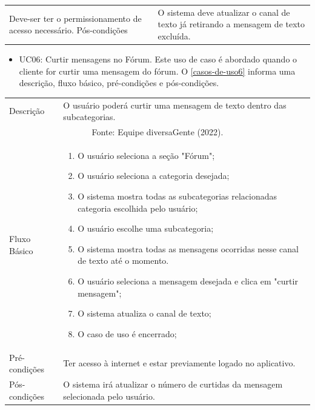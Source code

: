 \begin{apendicesenv}
\begin{longtable}{|p{3.3cm}|p{12.3cm}|}
		Deve-ser ter o permissionamento de acesso necessário.
		\hline
		Pós-condições & O sistema deve atualizar o canal de texto já retirando a mensagem de texto excluída.
		\hline
	\end{longtable}
	
	
	\begin{itemize}
		\item UC06: Curtir mensagens no Fórum. Este uso de caso é abordado quando o cliente for curtir uma mensagem do fórum. O 	\autoref{casos-de-uso6} informa uma descrição, fluxo básico, pré-condições e  pós-condições.\\
	\end{itemize}

	\begin{quadro}[htb]
		\centering
		\ABNTEXfontereduzida
		\caption[Caso de Uso Curtir mensagens no Fórum]{Caso de Uso Curtir mensagens no Fórum}
		\label{casos-de-uso6}
	\end{quadro}

\pagebreak

		\begin{longtable}{|p{3.3cm}|p{12.3cm}|}
		\hline
		\thead{} & \thead{Ator} \\
		\hline
		Descrição & O usuário poderá curtir uma mensagem de texto dentro das subcategorias.\\
		\hline
						
		\endfirsthead
		\multicolumn{2}{c}{\scriptsize Fonte: Equipe diversaGente (2022).}%
		{{ \autoref{casos-de-uso6} continued from previous page}} \\
		\endhead
		
		Fluxo Básico  & 
		\begin{enumerate}
			\item O usuário seleciona a seção "Fórum";
			\item O usuário seleciona a categoria desejada;
			\item O sistema mostra todas as subcategorias relacionadas categoria escolhida pelo usuário;
			\item O usuário escolhe uma subcategoria;
			\item O sistema mostra todas as mensagens ocorridas nesse canal de texto até o momento. 
			\item  O usuário seleciona a mensagem desejada e clica em "curtir mensagem";
			\item  O sistema atualiza o canal de texto;
			\item  O caso de uso é encerrado;
		\end{enumerate}\\
		\hline
		Pré-condições & Ter acesso à internet e estar previamente logado no aplicativo.\\
		\hline
		Pós-condições & O sistema irá atualizar o número de curtidas da mensagem selecionada pelo usuário.\\
		\hline
	

\end{longtable}
\end{apendicesenv}
